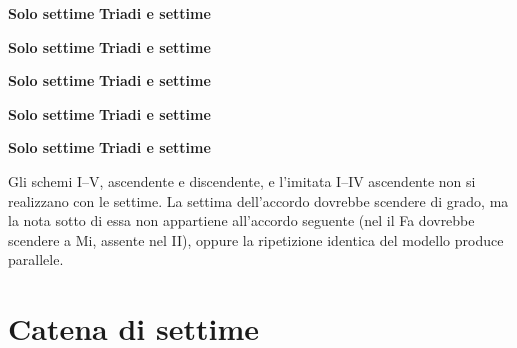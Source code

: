 \begin{esempio}
	\label{ex:prog_i4d_dia_sett}
	\textbf{Solo settime}
	\textbf{Triadi e settime}
\end{esempio}

\begin{esempio}
	\label{ex:prog_i4d_rea_sett}
	\textbf{Solo settime}
	\textbf{Triadi e settime}
\end{esempio}

\begin{esempio}
	\label{ex:prog_i4a_dia_sett}
	\textbf{Solo settime}
	\textbf{Triadi e settime}
\end{esempio}

\begin{esempio}
	\label{ex:prog_i4a_rea_sett}
	\textbf{Solo settime}
	\textbf{Triadi e settime}
\end{esempio}

\begin{esempio}
	\label{ex:imitata_i4d_sett}
	\textbf{Solo settime}
	\textbf{Triadi e settime}
\end{esempio}

\begin{osservazione}
	\label{oss:schemi_non_realizzabili}
	Gli schemi I--V, ascendente e discendente, e l'imitata I--IV ascendente non si realizzano con le settime. La settima dell'accordo dovrebbe scendere di grado, ma la nota sotto di essa non appartiene all'accordo seguente (nel  il Fa dovrebbe scendere a Mi, assente nel II), oppure la ripetizione identica del modello produce parallele.
\end{osservazione}

\section{Catena di settime}
\label{subsec:catena_settime}

